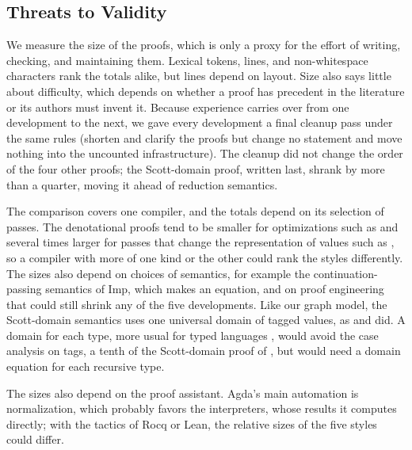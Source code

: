 \subsection{Threats to Validity}

We measure the size of the proofs, which is only a proxy for the
effort of writing, checking, and maintaining them. Lexical tokens,
lines, and non-whitespace characters rank the totals alike, but lines
depend on layout. Size also says little about difficulty, which depends on
whether a proof has precedent in the literature or its authors must
invent it. Because experience carries over from one development to the
next, we gave every development a final cleanup pass under the same
rules (shorten and clarify the proofs but change no statement and move
nothing into the uncounted infrastructure). The cleanup did not
change the order of the four other proofs; the Scott-domain proof,
written last, shrank by more than a quarter, moving it ahead of
reduction semantics.

The comparison covers one compiler, and the totals depend on its
selection of passes. The denotational proofs tend to be smaller for
optimizations such as  and several times larger for
passes that change the representation of values such as ,
so a compiler with more of one kind or the other could rank the styles
differently. The sizes also depend on choices of semantics, for
example the continuation-passing semantics of Imp, which makes
 an equation, and on proof engineering that
could still shrink any of the five developments.  Like our graph
model, the Scott-domain semantics uses one universal domain of tagged
values, as \citet{Milner:1978kh} and \citet{MacQueen:1986aa} did. A
domain for each type, more usual for typed languages
\citep{Benton:2009ab,Dockins:2014aa}, would avoid the case analysis on
tags, a tenth of the Scott-domain proof of , but would
need a domain equation for each recursive type.

The sizes also depend on the proof assistant. Agda's main automation
is normalization, which probably favors the interpreters, whose
results it computes directly; with the tactics of Rocq or Lean, the
relative sizes of the five styles could differ.
